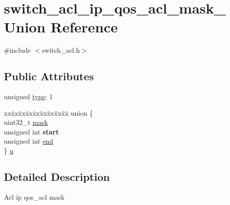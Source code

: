 \hypertarget{unionswitch__acl__ip__qos__acl__mask__}{\section{switch\+\_\+acl\+\_\+ip\+\_\+qos\+\_\+acl\+\_\+mask\+\_\+ Union Reference}
\label{unionswitch__acl__ip__qos__acl__mask__}
}


{\ttfamily \#include $<$switch\+\_\+acl.\+h$>$}

\subsection*{Public Attributes}
\begin{DoxyCompactItemize}
\item 
unsigned \hyperlink{unionswitch__acl__ip__qos__acl__mask___aa94a9719ab9da0c0d876427a73b12757}{type}\+: 1
\item 
\begin{tabbing}
xx\=xx\=xx\=xx\=xx\=xx\=xx\=xx\=xx\=\kill
union \{\\
\>uint32\_t \hyperlink{unionswitch__acl__ip__qos__acl__mask___aadd7c8dbb2ab22771a45b8eae00b514b}{mask}\\
\>unsigned int {\bfseries start}\\
\>unsigned int \hyperlink{unionswitch__acl__ip__qos__acl__mask___a1fd5524f10481932df909a6de710f0ff}{end}\\
\} \hyperlink{unionswitch__acl__ip__qos__acl__mask___afb24a94155b6eadc71d11053b65812c9}{u}\\

\end{tabbing}\end{DoxyCompactItemize}


\subsection{Detailed Description}
Acl ip qos\+\_\+acl mask 

